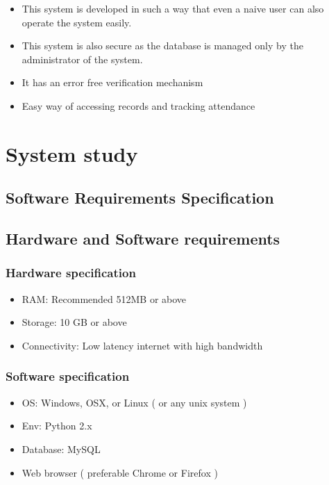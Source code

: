 \documentclass{article}
\begin{document}
\begin{itemize}
\item This system is developed in such a way that even a naive user can also operate the system easily.
\item This system is also secure as the database is managed only by
the administrator of the system.
\item It has an error free verification mechanism
\item Easy way of accessing records and tracking attendance
\end{itemize}


\newpage

\section{System study}
\vspace{1em}

\subsection{Software Requirements Specification}
\vspace{1em}
\subsection{Hardware and Software requirements}
\vspace{1em}
\subsubsection{Hardware specification}
\vspace{1em}
\begin{itemize}
\item RAM: Recommended 512MB or above
\item Storage: 10 GB or above
\item Connectivity: Low latency internet with high bandwidth
\end{itemize}
\subsubsection{Software specification}
\begin{itemize}
\item OS: Windows, OSX, or Linux ( or any unix system )
\item Env: Python 2.x
\item Database: MySQL
\item Web browser ( preferable Chrome or Firefox )
\end{itemize}
\vspace{1em}
\end{document}
